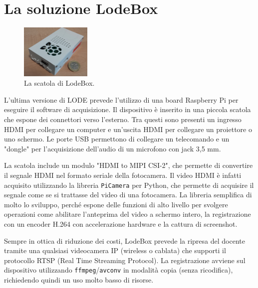 \section{La soluzione LodeBox}
\label{sec:intro_lodebox}

\begin{figure}
	\vspace{-12pt}
	\includegraphics[width=0.3\textwidth]{res/lodebox}
	\caption{\label{fig:lodebox} La scatola di LodeBox.}
\end{figure}

L'ultima versione di LODE prevede l'utilizzo di una board Raspberry Pi per eseguire il software di acquisizione. Il dispositivo è inserito in una piccola scatola che espone dei connettori verso l'esterno. Tra questi sono presenti un ingresso HDMI per collegare un computer e un'uscita HDMI per collegare un proiettore o uno schermo. Le porte USB permettono di collegare un telecomando e un "dongle" per l'acquisizione dell'audio di un microfono con jack 3,5 mm.

La scatola include un modulo "HDMI to MIPI CSI-2", che permette di convertire il segnale HDMI nel formato seriale della fotocamera. Il video HDMI è infatti acquisito utilizzando la libreria \texttt{PiCamera} per Python, che permette di acquisire il segnale come se si trattasse del video di una fotocamera. La libreria semplifica di molto lo sviluppo, perché espone delle funzioni di alto livello per svolgere operazioni come abilitare l'anteprima del video a schermo intero, la registrazione con un encoder H.264\footnotemark{} con accelerazione hardware e la cattura di screenshot.


Sempre in ottica di riduzione dei costi, LodeBox prevede la ripresa del docente tramite una qualsiasi videocamera IP (wireless o cablata) che supporti il protocollo RTSP (Real Time Streaming Protocol). La registrazione avviene sul dispositivo utilizzando \texttt{ffmpeg}/\texttt{avconv}\footnotemark{} in modalità copia (senza ricodifica), richiedendo quindi un uso molto basso di risorse.

